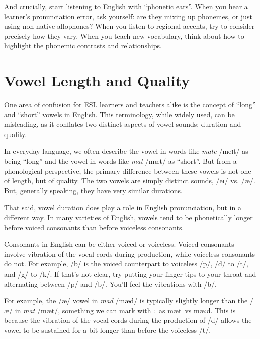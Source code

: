 And crucially, start listening to English with ``phonetic ears''. When you hear a learner's pronunciation error, ask yourself: are they mixing up phonemes, or just using non-native allophones? When you listen to regional accents, try to consider precisely how they vary. When you teach new vocabulary, think about how to highlight the phonemic contrasts and relationships.

\section{Vowel Length and Quality} \label{sec:long-vowels}

One area of confusion for ESL learners and teachers alike is the concept of ``long'' and ``short'' vowels in English. This terminology, while widely used, can be misleading, as it conflates two distinct aspects of vowel sounds: duration and quality.

In everyday language, we often describe the vowel in words like \textit{mate} /meɪt/ as being ``long'' and the vowel in words like \textit{mat} /mæt/ as ``short''. But from a phonological perspective, the primary difference between these vowels is not one of length, but of quality. The two vowels are simply distinct sounds, /eɪ/ vs. /æ/. But, generally speaking, they have very similar durations.

That said, vowel duration does play a role in English pronunciation, but in a different way. In many varieties of English, vowels tend to be phonetically longer before voiced consonants than before voiceless consonants.

\begin{tcolorbox}[title=Consonant Voicing]
Consonants in English can be either voiced or voiceless. Voiced consonants involve vibration of the vocal cords during production, while voiceless consonants do not. For example, /b/ is the voiced counterpart to voiceless /p/, /d/ to /t/, and /g/ to /k/. If that's not clear, try putting your finger tips to your throat and alternating between /p/ and /b/. You'll feel the vibrations with /b/.
\end{tcolorbox}

For example, the /æ/ vowel in \textit{mad} /mæd/ is typically slightly longer than the /æ/ in \textit{mat} /mæt/, something we can mark with \ob ː{\cb}~as \ob mæt{\cb}~vs \ob mæːd{\cb}. This is because the vibration of the vocal cords during the production of /d/ allows the vowel to be sustained for a bit longer than before the voiceless /t/.

